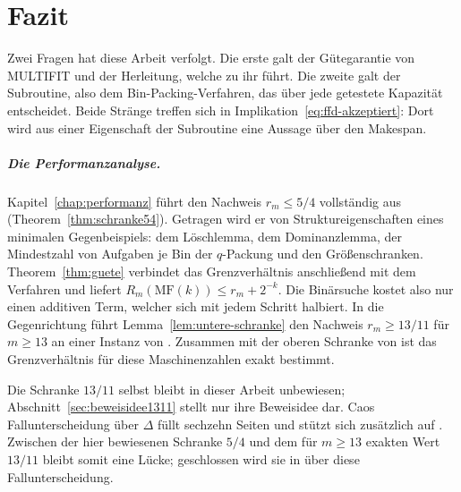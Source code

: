 \chapter{Fazit}
\label{chap:fazit}

Zwei Fragen hat diese Arbeit verfolgt.
Die erste galt der Gütegarantie von MULTIFIT und der Herleitung, welche zu ihr führt.
Die zweite galt der Subroutine, also dem Bin-Packing-Verfahren, das über jede getestete
Kapazität entscheidet.
Beide Stränge treffen sich in Implikation~\eqref{eq:ffd-akzeptiert}: Dort wird aus einer
Eigenschaft der Subroutine eine Aussage über den Makespan.

\paragraph{Die Performanzanalyse.}
Kapitel~\ref{chap:performanz} führt den Nachweis $r_m \le 5/4$ vollständig aus
(Theorem~\ref{thm:schranke54}).
Getragen wird er von Struktureigenschaften eines minimalen Gegenbeispiels: dem Löschlemma, dem
Dominanzlemma, der Mindestzahl von Aufgaben je Bin der $q$-Packung und den Größenschranken.
Theorem~\ref{thm:guete} verbindet das Grenzverhältnis anschließend mit dem Verfahren und liefert
$R_m(\mathrm{MF}(k)) \le r_m + 2^{-k}$.
Die Binärsuche kostet also nur einen additiven Term, welcher sich mit jedem Schritt halbiert.
In die Gegenrichtung führt Lemma~\ref{lem:untere-schranke} den Nachweis $r_m \ge 13/11$ für
$m \ge 13$ an einer Instanz von \textcite{friesen1984}.
Zusammen mit der oberen Schranke von \textcite{cao1995} ist das Grenzverhältnis für diese
Maschinenzahlen exakt bestimmt.

Die Schranke $13/11$ selbst bleibt in dieser Arbeit unbewiesen; Abschnitt~\ref{sec:beweisidee1311} stellt nur
ihre Beweisidee dar.
Caos Fallunterscheidung über $\Delta$ füllt sechzehn Seiten und stützt sich zusätzlich auf
\textcite{yue1990}.
Zwischen der hier bewiesenen Schranke $5/4$ und dem für $m \ge 13$ exakten Wert $13/11$ bleibt
somit eine Lücke; geschlossen wird sie in \cite{cao1995} über diese Fallunterscheidung.

